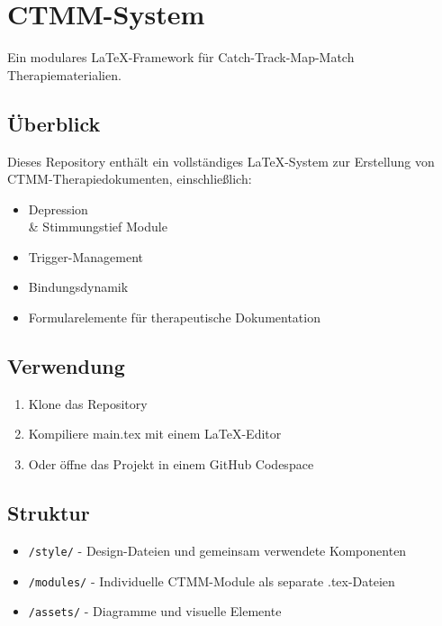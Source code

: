 \hypertarget{ctmm-system}{%
\section{CTMM-System}\label{ctmm-system}}

Ein modulares LaTeX-Framework für Catch-Track-Map-Match Therapiematerialien.

\hypertarget{ueberblick}{%
\subsection{Überblick}\label{ueberblick}}

Dieses Repository enthält ein vollständiges LaTeX-System zur Erstellung von CTMM-Therapiedokumenten, einschließlich:
\begin{itemize}
\item Depression \\& Stimmungstief Module
\item Trigger-Management
\item Bindungsdynamik
\item Formularelemente für therapeutische Dokumentation
\end{itemize}

\hypertarget{verwendung}{%
\subsection{Verwendung}\label{verwendung}}

\begin{enumerate}
\def\labelenumi{\arabic{enumi}.}
\tightlist
\item
  Klone das Repository
\item
  Kompiliere main.tex mit einem LaTeX-Editor
\item
  Oder öffne das Projekt in einem GitHub Codespace
\end{enumerate}

\hypertarget{struktur}{%
\subsection{Struktur}\label{struktur}}

\begin{itemize}
\tightlist
\item
  \texttt{/style/} - Design-Dateien und gemeinsam verwendete Komponenten
\item
  \texttt{/modules/} - Individuelle CTMM-Module als separate .tex-Dateien
\item
  \texttt{/assets/} - Diagramme und visuelle Elemente
\end{itemize}

